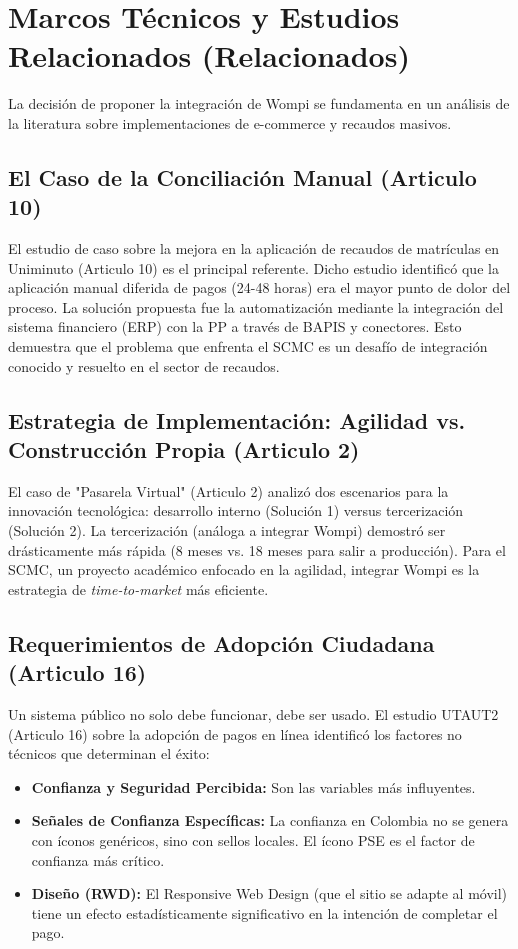 \section{Marcos Técnicos y Estudios Relacionados (Relacionados)}
La decisión de proponer la integración de Wompi se fundamenta en un análisis de la literatura sobre implementaciones de e-commerce y recaudos masivos.

\subsection{El Caso de la Conciliación Manual (Articulo 10)}
El estudio de caso sobre la mejora en la aplicación de recaudos de matrículas en Uniminuto (Articulo 10) es el principal referente. Dicho estudio identificó que la aplicación manual diferida de pagos (24-48 horas) era el mayor punto de dolor del proceso. La solución propuesta fue la automatización mediante la integración del sistema financiero (ERP) con la PP a través de BAPIS y conectores. Esto demuestra que el problema que enfrenta el SCMC es un desafío de integración conocido y resuelto en el sector de recaudos.

\subsection{Estrategia de Implementación: Agilidad vs. Construcción Propia (Articulo 2)}
El caso de "Pasarela Virtual" (Articulo 2) analizó dos escenarios para la innovación tecnológica: desarrollo interno (Solución 1) versus tercerización (Solución 2). La tercerización (análoga a integrar Wompi) demostró ser drásticamente más rápida (8 meses vs. 18 meses para salir a producción). Para el SCMC, un proyecto académico enfocado en la agilidad, integrar Wompi es la estrategia de \textit{time-to-market} más eficiente.

\subsection{Requerimientos de Adopción Ciudadana (Articulo 16)}
Un sistema público no solo debe funcionar, debe ser usado. El estudio UTAUT2 (Articulo 16) sobre la adopción de pagos en línea identificó los factores no técnicos que determinan el éxito:
\begin{itemize}
    \item \textbf{Confianza y Seguridad Percibida:} Son las variables más influyentes.
    \item \textbf{Señales de Confianza Específicas:} La confianza en Colombia no se genera con íconos genéricos, sino con sellos locales. El ícono PSE es el factor de confianza más crítico.
    \item \textbf{Diseño (RWD):} El Responsive Web Design (que el sitio se adapte al móvil) tiene un efecto estadísticamente significativo en la intención de completar el pago.
\end{itemize}

